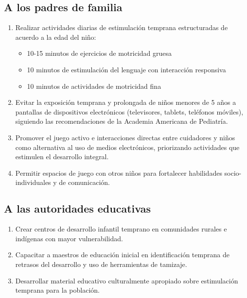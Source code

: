 \documentclass[11pt,letterpaper]{report}
\begin{document}
\subsection*{A los padres de familia}
\begin{enumerate}
\item Realizar actividades diarias de estimulación temprana estructuradas de acuerdo a la edad del niño:
\begin{itemize}
    \item 10-15 minutos de ejercicios de motricidad gruesa
    \item 10 minutos de estimulación del lenguaje con interacción responsiva
    \item 10 minutos de actividades de motricidad fina
\end{itemize}

\item Evitar la exposición temprana y prolongada de niños menores de 
5 años a pantallas de dispositivos electrónicos (televisores, tablets, 
teléfonos móviles), siguiendo las recomendaciones de la Academia Americana 
de Pediatría.

\item Promover el juego activo e interacciones directas entre 
cuidadores y niños como alternativa al uso de medios electrónicos, 
priorizando actividades que estimulen el desarrollo integral.

\item Permitir espacios de juego con otros niños para fortalecer 
habilidades socio-individuales y de comunicación.
\end{enumerate}

\subsection*{A las autoridades educativas}
\begin{enumerate}
\item Crear centros de desarrollo infantil temprano en comunidades rurales 
e indígenas con mayor vulnerabilidad.

\item Capacitar a maestros de educación inicial en identificación temprana 
de retrasos del desarrollo y uso de herramientas de tamizaje.

\item Desarrollar material educativo culturalmente apropiado sobre 
estimulación temprana para la población.
\end{enumerate}
\end{document}
